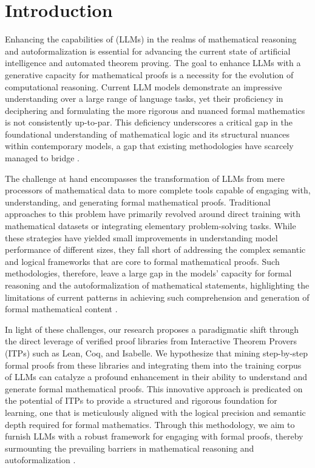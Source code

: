 \section{Introduction}

Enhancing the capabilities of (LLMs) in the realms of mathematical reasoning and autoformalization is essential for advancing the current state of artificial intelligence and automated theorem proving. The goal to enhance LLMs with a generative capacity for mathematical proofs is a necessity for the evolution of computational reasoning. Current LLM models demonstrate an impressive understanding over a large range of language tasks, yet their proficiency in deciphering and formulating the more rigorous and nuanced formal mathematics is not consistently up-to-par. This deficiency underscores a critical gap in the foundational understanding of mathematical logic and its structural nuances within contemporary models, a gap that existing methodologies have scarcely managed to bridge \cite{polu2022formal}.

The challenge at hand encompasses the transformation of LLMs from mere processors of mathematical data to more complete tools capable of engaging with, understanding, and generating formal mathematical proofs. Traditional approaches to this problem have primarily revolved around direct training with mathematical datasets or integrating elementary problem-solving tasks. While these strategies have yielded small improvements in understanding model performance of different sizes, they fall short of addressing the complex semantic and logical frameworks that are core to formal mathematical proofs. Such methodologies, therefore, leave a large gap in the models' capacity for formal reasoning and the autoformalization of mathematical statements, highlighting the limitations of current patterns in achieving such comprehension and generation of formal mathematical content \cite{bansal2019holist}.

In light of these challenges, our research proposes a paradigmatic shift through the direct leverage of verified proof libraries from Interactive Theorem Provers (ITPs) such as Lean, Coq, and Isabelle. We hypothesize that mining step-by-step formal proofs from these libraries and integrating them into the training corpus of LLMs can catalyze a profound enhancement in their ability to understand and generate formal mathematical proofs. This innovative approach is predicated on the potential of ITPs to provide a structured and rigorous foundation for learning, one that is meticulously aligned with the logical precision and semantic depth required for formal mathematics. Through this methodology, we aim to furnish LLMs with a robust framework for engaging with formal proofs, thereby surmounting the prevailing barriers in mathematical reasoning and autoformalization \cite{szegedy2020promising} \cite{wu2022autoformalization}.

